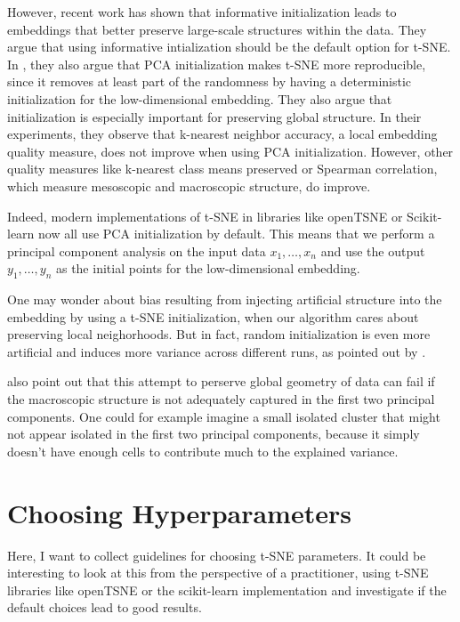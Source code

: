 However, recent work \cite{kobak21} has shown that informative initialization leads to embeddings that better preserve large-scale structures within the data. 
They argue that using informative intialization should be the default option for t-SNE.
In \cite{KoBe19SingleCell}, they also argue that PCA initialization makes t-SNE more reproducible, since it removes at least part of the randomness by having a deterministic initialization for the low-dimensional embedding. 
They also argue that initialization is especially important for preserving global structure. 
In their experiments, they observe that k-nearest neighbor accuracy, a local embedding quality measure, does not improve when using PCA initialization. 
However, other quality measures like k-nearest class means preserved or Spearman correlation, which measure mesoscopic and macroscopic structure, do improve. 

Indeed, modern implementations of t-SNE in libraries like openTSNE \cite{openTSNE} or Scikit-learn now all use PCA initialization by default. 
This means that we perform a principal component analysis on the input data $x_1, \dots, x_n$ and use the output $y_1, \dots, y_n$ as the initial points for the low-dimensional embedding. 

One may wonder about bias resulting from injecting artificial structure into the embedding by using a t-SNE initialization, when our algorithm cares about preserving local neighorhoods. But in fact, random initialization is even more artificial and induces more variance across different runs, as pointed out by \cite{KoBe19SingleCell}. 

\cite{KoBe19SingleCell} also point out that this attempt to perserve global geometry of data can fail if the macroscopic structure is not adequately captured in the first two principal components. 
One could for example imagine a small isolated cluster that might not appear isolated in the first two principal components, because it simply doesn't have enough cells to contribute much to the explained variance. 


\section{Choosing Hyperparameters}
Here, I want to collect guidelines for choosing t-SNE parameters. It could be interesting to look at this from the perspective of a practitioner, using t-SNE libraries like openTSNE or the scikit-learn implementation and investigate if the default choices lead to good results. 



